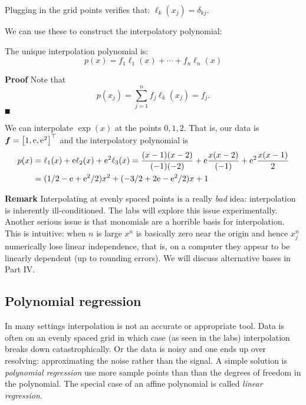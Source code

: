 Plugging in the grid points verifies that: $\ensuremath{\ell}_k(x_j) = \ensuremath{\delta}_{kj}$.

We can use these to construct the interpolatory polynomial:

\begin{theorem} The unique interpolation polynomial is:
\[
p(x) = f_1 \ensuremath{\ell}_1(x) + \ensuremath{\cdots} + f_n \ensuremath{\ell}_n(x)
\]
\end{theorem}
\textbf{Proof} Note that
\[
p(x_j) = \ensuremath{\sum}_{j=1}^n f_j \ensuremath{\ell}_k(x_j) = f_j.
\]
\ensuremath{\QED}

\begin{example} We can interpolate $\exp(x)$ at the points $0,1,2$. That is, our data is $\ensuremath{\bm{\f}} = \vectt[1, {\rm e},{\rm e}^2]$ and the interpolatory polynomial is
\begin{align*}
p(x) &= \ensuremath{\ell}_1(x) + {\rm e} \ensuremath{\ell}_2(x) + {\rm e}^2 \ensuremath{\ell}_3(x) =
{(x - 1) (x-2) \over (-1)(-2)} + {\rm e} {x (x-2) \over (-1)} +
{\rm e}^2 {x (x-1) \over 2} \\
&= (1/2 - {\rm e} +{\rm e}^2/2)x^2 + (-3/2 + 2 {\rm e}  - {\rm e}^2 /2) x + 1
\end{align*}
\end{example}

\textbf{Remark} Interpolating at evenly spaced points is a really \emph{bad} idea: interpolation is inherently ill-conditioned. The labs will explore this issue experimentally. Another serious issue is that monomials are a horrible basis for interpolation. This is intuitive: when $n$ is large $x^n$ is basically zero near the origin and hence $x_j^n$ numerically lose linear independence, that is, on a computer they appear to be linearly dependent (up to rounding errors). We will discuss alternative bases in Part IV.

\subsection{Polynomial regression}
In many settings interpolation is not an accurate or appropriate tool. Data is often on an evenly spaced grid in which case (as seen in the labs) interpolation breaks down catastrophically. Or the data is noisy and one ends up over resolving: approximating the noise rather than the signal. A simple solution is \emph{polynomial regression} use more sample points than than the degrees of freedom in the polynomial. The special case of an affine polynomial is called \emph{linear regression}.

